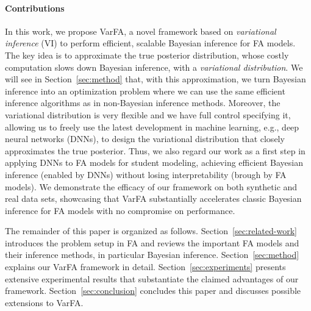 \documentclass{edm_article}
\newcommand{\ml}[1]{\textcolor{orange}{\bf [LAN bandit: #1]}}
\newcommand{\jack}[1]{\textcolor{purple}{\bf [jack the ripper: #1]}}
\begin{document}
\paragraph{Contributions}
In this work, we propose VarFA, a novel framework based on \textit{variational inference} (VI) to perform efficient, scalable Bayesian inference for FA models. The key idea is to approximate the true posterior distribution, whose costly computation slows down Bayesian inference, with a \textit{variational distribution}. We will see in Section~\ref{sec:method} that, with this approximation, we turn Bayesian inference into an optimization problem where we can use the same efficient inference algorithms as in non-Bayesian inference methods. Moreover, the variational distribution is very flexible and we have full control specifying it, allowing us to freely use the latest development in machine learning, e.g., deep neural networks (DNNs), to design the variational distribution that closely approximates the true posterior. 
Thus, we also regard our work as a first step in applying DNNs to FA models for student modeling, achieving efficient Bayesian inference (enabled by DNNs) without losing interpretability (brough by FA models).
We demonstrate the efficacy of our framework on both synthetic and real data sets, showcasing that VarFA substantially accelerates classic Bayesian inference for FA models with no compromise on performance. 

The remainder of this paper is organized as follows. Section~\ref{sec:related-work} introduces the problem setup in FA and reviews the important FA models and their inference methods, in particular Bayesian inference. Section~\ref{sec:method} explains our VarFA framework in detail. Section~\ref{sec:experiments} presents extensive experimental results that substantiate the claimed advantages of our framework. Section~\ref{sec:conclusion} concludes this paper and discusses possible extensions to VarFA.
\end{document}
